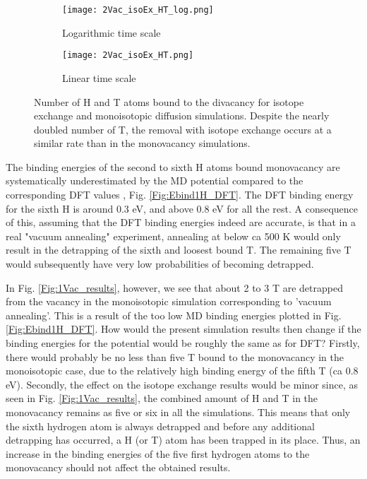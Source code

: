 \begin{figure}[!ht]
\begin{subfigure}{.5\textwidth}
  \centering
 \texttt{[image: 2Vac\_isoEx\_HT\_log.png]}  
  \caption{Logarithmic time scale}
\end{subfigure}
\begin{subfigure}{.5\textwidth}
  \centering
  \texttt{[image: 2Vac\_isoEx\_HT.png]}  
  \caption{Linear time scale}
\end{subfigure}
   \caption{Number of H and T atoms bound to the divacancy for isotope exchange and monoisotopic diffusion simulations. Despite the nearly doubled number of T, the removal with isotope exchange occurs at a similar rate than in the monovacancy simulations.}
   \label{Fig:2Vac_results} 
\end{figure}

The binding energies of the second to sixth H atoms bound monovacancy are systematically underestimated by the MD potential compared to the corresponding DFT values \cite{heinolaTungstenDFT}, Fig. \ref{Fig:Ebind1H_DFT}.
The DFT binding energy for the sixth H is around 0.3 eV, and above 0.8 eV for all the rest.
A consequence of this, assuming that the DFT binding energies indeed are accurate, is that in a real "vacuum annealing" experiment, annealing at below ca 500 K would only result in the detrapping of the sixth and loosest bound T.
The remaining five T would subsequently have very low probabilities of becoming detrapped.

In Fig. \ref{Fig:1Vac_results}, however, we see that about 2 to 3 T are detrapped from the vacancy in the monoisotopic simulation corresponding to 'vacuum annealing'.
This is a result of the too low MD binding energies plotted in Fig. \ref{Fig:Ebind1H_DFT}.
How would the present simulation results then change if the binding energies for the potential would be roughly the same as for DFT?
Firstly, there would probably be no less than five T bound to the monovacancy in the monoisotopic case, due to the relatively high binding energy of the fifth T (ca 0.8 eV).
Secondly, the effect on the isotope exchange results would be minor since, as seen in Fig. \ref{Fig:1Vac_results}, the combined amount of H and T in the monovacancy remains as five or six in all the simulations.
This means that only the sixth hydrogen atom is always detrapped and before any additional detrapping has occurred, a H (or T) atom has been trapped in its place.
Thus, an increase in the binding energies of the five first hydrogen atoms to the monovacancy should not affect the obtained results.

